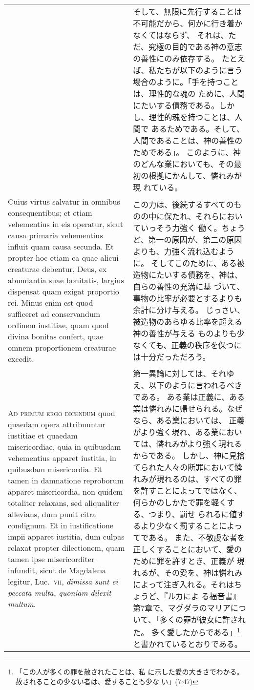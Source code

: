 \documentclass[10pt]{jsarticle} %
\begin{document}
{\begin{longtable}{p{21em}p{21em}}
&

そして、無限に先行することは不可能だから、何かに行き着かなくてはならず、
 それは、ただ、究極の目的である神の意志の善性にのみ依存する。
たとえば、私たちが以下のように言う場合のように。「手を持つことは、理性的な魂の
 ために、人間にたいする債務である。しかし、理性的魂を持つことは、人間で
 あるためである。そして、人間であることは、神の善性のためである」。
このように、神のどんな業においても、その最初の根拠にかんして、憐れみが現
 れている。


\\

Cuius virtus salvatur in omnibus
consequentibus; et etiam vehementius in eis operatur, sicut causa
primaria vehementius influit quam causa secunda. Et propter hoc etiam ea
quae alicui creaturae debentur, Deus, ex abundantia suae bonitatis,
largius dispensat quam exigat proportio rei. Minus enim est quod
sufficeret ad conservandum ordinem iustitiae, quam quod divina bonitas
confert, quae omnem proportionem creaturae excedit.


&

この力は、後続するすべてのものの中に保たれ、それらにおいていっそう力強く
 働く。ちょうど、第一の原因が、第二の原因よりも、力強く流れ込むように。
そしてこのために、ある被造物にたいする債務を、神は、自らの善性の充満に基
 づいて、事物の比率が必要とするよりも余計に分け与える。
じっさい、被造物のあらゆる比率を超える神の善性が与える
 ものよりも少なくても、正義の秩序を保つには十分だっただろう。
 



\\


{\scshape Ad primum ergo dicendum} quod quaedam opera
attribuuntur iustitiae et quaedam misericordiae, quia in quibusdam
vehementius apparet iustitia, in quibusdam misericordia. Et tamen in
damnatione reproborum apparet misericordia, non quidem totaliter
relaxans, sed aliqualiter allevians, dum punit citra condignum. Et in
iustificatione impii apparet iustitia, dum culpas relaxat propter
dilectionem, quam tamen ipse misericorditer infundit, sicut de Magdalena
legitur, Luc.~{\scshape vii}, {\itshape dimissa sunt ei peccata multa, quoniam dilexit
multum}.


&

第一異論に対しては、それゆえ、以下のように言われるべきである。
ある業は正義に、ある業は憐れみに帰せられる。なぜなら、ある業においては、
 正義がより強く現れ、ある業においては、憐れみがより強く現れるからである。
しかし、神に見捨てられた人々の断罪において憐れみが現れるのは、すべての罪
 を許すことによってではなく、何らかのしかたで罪を軽くする、つまり、罰せ
 られるに値するより少なく罰することによってである。
また、不敬虔な者を正しくすることにおいて、愛のために罪を許すとき、正義が
 現れるが、その愛を、神は憐れみによって注ぎ入れる。それはちょうど、『ルカによ
 る福音書』第7章で、マグダラのマリアについて、「多くの罪が彼女に許された。
 多く愛したからである」\footnote{「この人が多くの罪を赦されたことは、私
 に示した愛の大きさでわかる。赦されることの少ない者は、愛することも少な
 い」(7:47)}と書かれているとおりである。




\end{longtable}}
\end{document}
